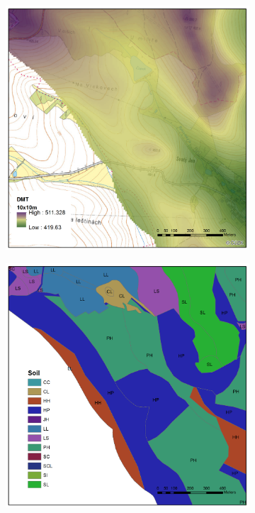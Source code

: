 \begin{figure}[t!]
  \centering

  \begin{subfigure}[b]{0.4\linewidth}
    \centering\includegraphics[width=1\linewidth]{./img/DMT_byk.png}
    \caption{\label{fig:dmt}}
  \end{subfigure}%
  \begin{subfigure}[b]{0.4\linewidth}
    \centering\includegraphics[width=1\linewidth]{./img/pudy.png}

\end{subfigure}
\end{figure}
